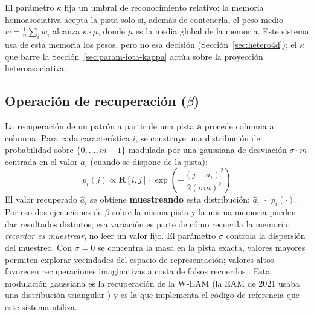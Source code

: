 El parámetro $\kappa$ fija un umbral de reconocimiento relativo: la memoria
homoasociativa acepta la pista solo si, además de contenerla, el peso medio
$\bar{w} = \frac{1}{n}\sum_i w_i$ alcanza $\kappa \cdot \bar{\mu}$, donde $\bar{\mu}$ es
la media global de la memoria.
Este sistema usa de esta memoria los pesos, pero no esa decisión
(Sección~\ref{sec:hetero4d}); el $\kappa$ que barre la
Sección~\ref{sec:param-iota-kappa} actúa sobre la proyección heteroasociativa.

\subsection*{Operación de recuperación ($\beta$)}

La recuperación de un patrón a partir de una pista $\mathbf{a}$ procede columna a columna.
Para cada característica $i$, se construye una distribución de probabilidad sobre $\{0,\ldots,m-1\}$
modulada por una gaussiana de desviación $\sigma \cdot m$ centrada en el valor $a_i$
(cuando se dispone de la pista):
\begin{equation}
    p_i(j) \propto \mathbf{R}[i, j] \cdot \exp\!\left(-\frac{(j - a_i)^2}{2(\sigma m)^2}\right)
    \label{eq:distribucion-recuperacion}
\end{equation}
El valor recuperado $\hat{a}_i$ se obtiene \textbf{muestreando} esta distribución:
$\hat{a}_i \sim p_i(\cdot)$.
Por eso dos ejecuciones de $\beta$ sobre la misma pista y la misma memoria pueden dar
resultados distintos; esa variación es parte de cómo recuerda la memoria:
\emph{recordar es muestrear}, no leer un valor fijo.
El parámetro $\sigma$ controla la dispersión del muestreo.
Con $\sigma = 0$ se concentra la masa en la pista exacta, valores mayores permiten
explorar vecindades del espacio de representación; valores altos favorecen
recuperaciones imaginativas a costa de falsos recuerdos \cite{pineda2023imagery}.
Esta modulación gaussiana es la recuperación de la W-EAM \cite{pineda2022weighted}
(la EAM de 2021 usaba una distribución triangular \cite{pineda2021entropic}) y es la
que implementa el código de referencia que este sistema utiliza.

